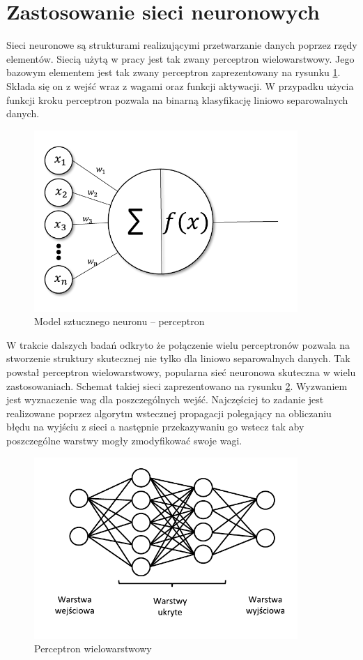 \documentclass[inzynierska]{pwr_wmat_praca_dyplomowa}
\theoremstyle{plain}
\numberwithin{theorem}{chapter}
\theoremstyle{definition}
\numberwithin{theorem}{chapter}
\begin{document}
\section{Zastosowanie sieci neuronowych}

Sieci neuronowe są strukturami realizującymi przetwarzanie danych poprzez rzędy elementów. Siecią użytą w pracy jest tak zwany perceptron wielowarstwowy. Jego bazowym elementem jest tak zwany perceptron zaprezentowany na rysunku \ref{perceptron}. Składa się on z wejść wraz z wagami oraz funkcji aktywacji. W przypadku użycia funkcji kroku perceptron pozwala na binarną klasyfikację liniowo separowalnych danych. 
\begin{figure}[ht]
	\centering
	\includegraphics[width=10cm]{images/perceptron_c.pdf}
	\caption{Model sztucznego neuronu -- perceptron}
	\label{perceptron}
\end{figure}
W trakcie dalszych badań odkryto że połączenie wielu perceptronów pozwala na stworzenie struktury skutecznej nie tylko dla liniowo separowalnych danych. Tak powstał perceptron wielowarstwowy, popularna sieć neuronowa skuteczna w wielu zastosowaniach. Schemat takiej sieci zaprezentowano na rysunku \ref{mlp}. Wyzwaniem jest wyznaczenie wag dla poszczególnych wejść. Najczęściej to zadanie jest realizowane poprzez algorytm wstecznej propagacji polegający na obliczaniu błędu na wyjściu z sieci a następnie przekazywaniu go wstecz tak aby poszczególne warstwy mogły zmodyfikować swoje wagi. 
\begin{figure}[ht]
	\centering
	\includegraphics[width=10cm]{images/siec_c.pdf}
	\caption{Perceptron wielowarstwowy}
	\label{mlp}
\end{figure}
\end{document}
